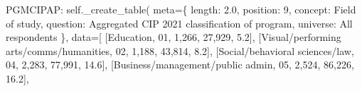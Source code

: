 \documentclass[
  11pt,
  a4paper,
]{article}
\newenvironment{Shaded}{\begin{snugshade}}{\end{snugshade}}
\newcommand{\NormalTok}[1]{\textcolor[rgb]{0.00,0.23,0.31}{#1}}
\newcommand{\OperatorTok}[1]{\textcolor[rgb]{0.37,0.37,0.37}{#1}}
\newcommand{\StringTok}[1]{\textcolor[rgb]{0.13,0.47,0.30}{#1}}
\newcommand{\VariableTok}[1]{\textcolor[rgb]{0.07,0.07,0.07}{#1}}
\begin{document}
\begin{Shaded}
\begin{Highlighting}[]
            \StringTok{\textquotesingle{}PGMCIPAP\textquotesingle{}}\NormalTok{: }\VariableTok{self}\NormalTok{.\_create\_table(}
\NormalTok{                meta}\OperatorTok{=}\NormalTok{\{}
                \StringTok{\textquotesingle{}length\textquotesingle{}}\NormalTok{: }\StringTok{\textquotesingle{}2.0\textquotesingle{}}\NormalTok{, }\StringTok{\textquotesingle{}position\textquotesingle{}}\NormalTok{: }\StringTok{\textquotesingle{}9\textquotesingle{}}\NormalTok{,}
                \StringTok{\textquotesingle{}concept\textquotesingle{}}\NormalTok{: }\StringTok{\textquotesingle{}Field of study\textquotesingle{}}\NormalTok{,}
                \StringTok{\textquotesingle{}question\textquotesingle{}}\NormalTok{: }\StringTok{\textquotesingle{}Aggregated CIP 2021 classification of program\textquotesingle{}}\NormalTok{,}
                \StringTok{\textquotesingle{}universe\textquotesingle{}}\NormalTok{: }\StringTok{\textquotesingle{}All respondents\textquotesingle{}}
\NormalTok{                \},}
\NormalTok{                data}\OperatorTok{=}\NormalTok{[}
\NormalTok{                [}\StringTok{\textquotesingle{}Education\textquotesingle{}}\NormalTok{, }\StringTok{\textquotesingle{}01\textquotesingle{}}\NormalTok{, }\StringTok{\textquotesingle{}1,266\textquotesingle{}}\NormalTok{, }\StringTok{\textquotesingle{}27,929\textquotesingle{}}\NormalTok{, }\StringTok{\textquotesingle{}5.2\textquotesingle{}}\NormalTok{],}
\NormalTok{                [}\StringTok{\textquotesingle{}Visual/performing arts/comms/humanities\textquotesingle{}}\NormalTok{, }\StringTok{\textquotesingle{}02\textquotesingle{}}\NormalTok{, }\StringTok{\textquotesingle{}1,188\textquotesingle{}}\NormalTok{, }\StringTok{\textquotesingle{}43,814\textquotesingle{}}\NormalTok{, }\StringTok{\textquotesingle{}8.2\textquotesingle{}}\NormalTok{],}
\NormalTok{                [}\StringTok{\textquotesingle{}Social/behavioral sciences/law\textquotesingle{}}\NormalTok{, }\StringTok{\textquotesingle{}04\textquotesingle{}}\NormalTok{, }\StringTok{\textquotesingle{}2,283\textquotesingle{}}\NormalTok{, }\StringTok{\textquotesingle{}77,991\textquotesingle{}}\NormalTok{, }\StringTok{\textquotesingle{}14.6\textquotesingle{}}\NormalTok{],}
\NormalTok{                [}\StringTok{\textquotesingle{}Business/management/public admin\textquotesingle{}}\NormalTok{, }\StringTok{\textquotesingle{}05\textquotesingle{}}\NormalTok{, }\StringTok{\textquotesingle{}2,524\textquotesingle{}}\NormalTok{, }\StringTok{\textquotesingle{}86,226\textquotesingle{}}\NormalTok{, }\StringTok{\textquotesingle{}16.2\textquotesingle{}}\NormalTok{],}

\end{Highlighting}
\end{Shaded}
\end{document}

